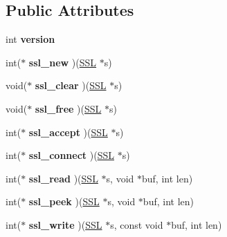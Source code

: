 \subsection*{Public Attributes}
\begin{DoxyCompactItemize}
\item 
\mbox{\label{structssl__method__st_a1d231051899c943c03267d9ede6d2488}} 
int {\bfseries version}
\item 
\mbox{\label{structssl__method__st_a7a5b5fc62a1f2d1e130bb67f5da66a81}} 
int($\ast$ {\bfseries ssl\+\_\+new} )(\hyperlink{structssl__st}{S\+SL} $\ast$s)
\item 
\mbox{\label{structssl__method__st_ae1a1f21bb25134669738357096bfd629}} 
void($\ast$ {\bfseries ssl\+\_\+clear} )(\hyperlink{structssl__st}{S\+SL} $\ast$s)
\item 
\mbox{\label{structssl__method__st_a8df364610bd0f741b9fe078a69d88e28}} 
void($\ast$ {\bfseries ssl\+\_\+free} )(\hyperlink{structssl__st}{S\+SL} $\ast$s)
\item 
\mbox{\label{structssl__method__st_a414ff7e2c280fb8e5cee22bff2df8717}} 
int($\ast$ {\bfseries ssl\+\_\+accept} )(\hyperlink{structssl__st}{S\+SL} $\ast$s)
\item 
\mbox{\label{structssl__method__st_acfec7986091a9749de81345a3833b595}} 
int($\ast$ {\bfseries ssl\+\_\+connect} )(\hyperlink{structssl__st}{S\+SL} $\ast$s)
\item 
\mbox{\label{structssl__method__st_a113246b4c830059207f54935b8874289}} 
int($\ast$ {\bfseries ssl\+\_\+read} )(\hyperlink{structssl__st}{S\+SL} $\ast$s, void $\ast$buf, int len)
\item 
\mbox{\label{structssl__method__st_a4216ad37e9a089392b0fe1915ed745d7}} 
int($\ast$ {\bfseries ssl\+\_\+peek} )(\hyperlink{structssl__st}{S\+SL} $\ast$s, void $\ast$buf, int len)
\item 
\mbox{\label{structssl__method__st_aeaa1745bfd8cea08b5d943fa49c1804a}} 
int($\ast$ {\bfseries ssl\+\_\+write} )(\hyperlink{structssl__st}{S\+SL} $\ast$s, const void $\ast$buf, int len)

\end{DoxyCompactItemize}
